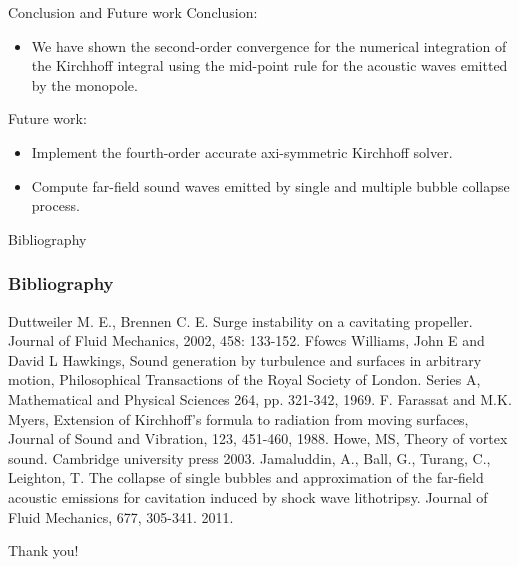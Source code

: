 \documentclass[10pt, aspectratio=169]{beamer}
\begin{document}
\begin{frame}{Conclusion and Future work}
	Conclusion:
	\begin{itemize}
		\item We have shown the second-order convergence for the numerical integration of the Kirchhoff integral using the mid-point rule for the acoustic waves emitted by the monopole.
		
	\end{itemize}
	Future work:
	\begin{itemize}
		\item Implement the fourth-order accurate axi-symmetric Kirchhoff solver.
		\item Compute far-field sound waves emitted by single and multiple bubble collapse process.
	\end{itemize}
\end{frame}

\begin{frame}[allowframebreaks]{Bibliography}
	\frametitle{Bibliography}
	
	\begin{thebibliography}{99}
		 Duttweiler M. E., Brennen C. E. Surge instability on a cavitating propeller. Journal of Fluid Mechanics, 2002, 458: 133-152.
		 Ffowcs Williams, John E and David L Hawkings, Sound generation by turbulence and surfaces in arbitrary motion, Philosophical Transactions of the Royal Society of London. Series A, Mathematical and Physical Sciences 264, pp. 321-342, 1969.
		 F. Farassat and M.K. Myers, Extension of Kirchhoff's formula to radiation from moving surfaces, Journal of Sound and Vibration, 123, 451-460, 1988.
		 Howe, MS, Theory of vortex sound. Cambridge university press 2003.
		 Jamaluddin, A., Ball, G., Turang, C., Leighton, T. The collapse of single bubbles and approximation of the far-field acoustic emissions for cavitation induced by shock wave lithotripsy. Journal of Fluid Mechanics, 677, 305-341. 2011.
	\end{thebibliography}
\end{frame}

\begin{frame}[standout]
	Thank you!
\end{frame}
\end{document}
